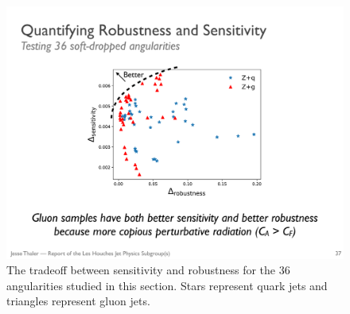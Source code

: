 \begin{figure}[h!]
\begin{center}
\includegraphics[width = 0.6\columnwidth]{figures/robseptradeoff.pdf}
\end{center}
\caption{The tradeoff between sensitivity and robustness for the 36 angularities studied in this section.  Stars represent quark jets and triangles represent gluon jets.}
\label{fig:robseptradeoff}
\end{figure}
